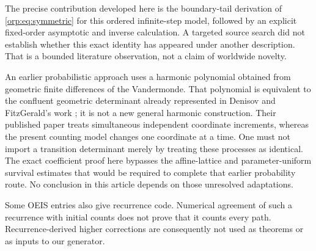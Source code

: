 \documentclass[11pt]{article}
\theoremstyle{remark}\newtheorem{remark}[theorem]{Remark}
\begin{document}
The precise contribution developed here is the boundary-tail derivation of \eqref{orp:eq:symmetric} for this ordered infinite-step model, followed by an explicit fixed-order asymptotic and inverse calculation. A targeted source search did not establish whether this exact identity has appeared under another description. That is a bounded literature observation, not a claim of worldwide novelty.

An earlier probabilistic approach uses a harmonic polynomial obtained from geometric finite differences of the Vandermonde. That polynomial is equivalent to the confluent geometric determinant already represented in Denisov and FitzGerald's work \cite{df}; it is not a new general harmonic construction. Their published paper treats simultaneous independent coordinate increments, whereas the present counting model changes one coordinate at a time. One must not import a transition determinant merely by treating these processes as identical. The exact coefficient proof here bypasses the affine-lattice and parameter-uniform survival estimates that would be required to complete that earlier probability route. No conclusion in this article depends on those unresolved adaptations.

Some OEIS entries also give recurrence code. Numerical agreement of such a recurrence with initial counts does not prove that it counts every path. Recurrence-derived higher corrections are consequently not used as theorems or as inputs to our generator.
\end{document}

